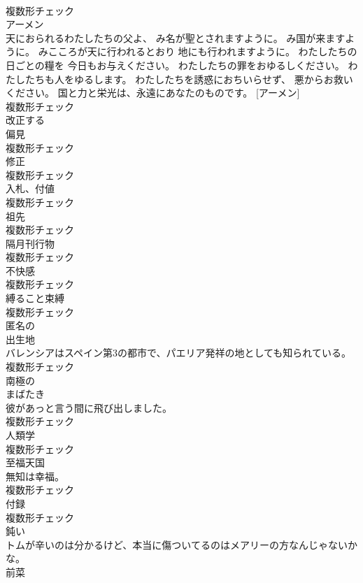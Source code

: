 \documentclass[8pt]{extreport}
\begin{document}
\begin{CJK}{UTF8}{min}
\\	複数形チェック
\\	[名詞]	アーメン	
\\	天におられるわたしたちの父よ、 み名が聖とされますように。 み国が来ますように。 みこころが天に行われるとおり 地にも行われますように。 わたしたちの日ごとの糧を 今日もお与えください。 わたしたちの罪をおゆるしください。 わたしたちも人をゆるします。 わたしたちを誘惑におちいらせず、 悪からお救いください。 国と力と栄光は、永遠にあなたのものです。 [アーメン]	
\\	複数形チェック
\\	[動詞]	改正する	
\\	[名詞]	偏見	
\\	複数形チェック
\\	[名詞]	修正	
\\	複数形チェック
\\	[名詞]	入札、付値	
\\	複数形チェック
\\	[名詞]	祖先	
\\	複数形チェック
\\	[名詞]	隔月刊行物	
\\	複数形チェック
\\	[名詞]	不快感	
\\	複数形チェック
\\	[名詞]	縛ること束縛	
\\	複数形チェック
\\	[形容詞]	匿名の	
\\	[名詞]	出生地	
\\	バレンシアはスペイン第3の都市で、パエリア発祥の地としても知られている。	
\\	複数形チェック
\\	[形容詞]	南極の	
\\	[名詞]	まばたき	
\\	彼があっと言う間に飛び出しました。	
\\	複数形チェック
\\	[名詞]	人類学	
\\	複数形チェック
\\	[名詞]	至福天国	
\\	無知は幸福。	
\\	複数形チェック
\\	[名詞]	付録	
\\	複数形チェック
\\	[形容詞]	鈍い	
\\	トムが辛いのは分かるけど、本当に傷ついてるのはメアリーの方なんじゃないかな。	
\\	[名詞]	前菜	

\end{CJK}
\end{document}
